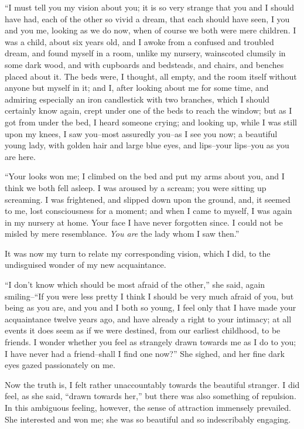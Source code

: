 \documentclass[11pt,twoside,makeidx,hidelinks,]{memoir}
\begin{document}
``I must tell you my vision about you; it is so very strange that you and
I should have had, each of the other so vivid a dream, that each should
have seen, I you and you me, looking as we do now, when of course we
both were mere children. I was a child, about six years old, and I awoke
from a confused and troubled dream, and found myself in a room, unlike
my nursery, wainscoted clumsily in some dark wood, and with cupboards
and bedsteads, and chairs, and benches placed about it. The beds were,
I thought, all empty, and the room itself without anyone but myself in
it; and I, after looking about me for some time, and admiring especially
an iron candlestick with two branches, which I should certainly know
again, crept under one of the beds to reach the window; but as I got
from under the bed, I heard someone crying; and looking up, while I was
still upon my knees, I saw you--most assuredly you--as I see you now; a
beautiful young lady, with golden hair and large blue eyes, and
lips--your lips--you as you are here.

``Your looks won me; I climbed on the bed and put my arms about you, and
I think we both fell asleep. I was aroused by a scream; you were sitting
up screaming. I was frightened, and slipped down upon the ground, and,
it seemed to me, lost consciousness for a moment; and when I came to
myself, I was again in my nursery at home. Your face I have never
forgotten since. I could not be misled by mere resemblance. \emph{You are}
the lady whom I saw then.''

It was now my turn to relate my corresponding vision, which I did, to
the undisguised wonder of my new acquaintance.

``I don't know which should be most afraid of the other,'' she said, again
smiling--``If you were less pretty I think I should be very much afraid
of you, but being as you are, and you and I both so young, I feel only
that I have made your acquaintance twelve years ago, and have already a
right to your intimacy; at all events it does seem as if we were
destined, from our earliest childhood, to be friends. I wonder whether
you feel as strangely drawn towards me as I do to you; I have never had
a friend--shall I find one now?'' She sighed, and her fine dark eyes
gazed passionately on me.

Now the truth is, I felt rather unaccountably towards the beautiful
stranger. I did feel, as she said, ``drawn towards her,'' but there was
also something of repulsion. In this ambiguous feeling, however, the
sense of attraction immensely prevailed. She interested and won me; she
was so beautiful and so indescribably engaging.
\end{document}
